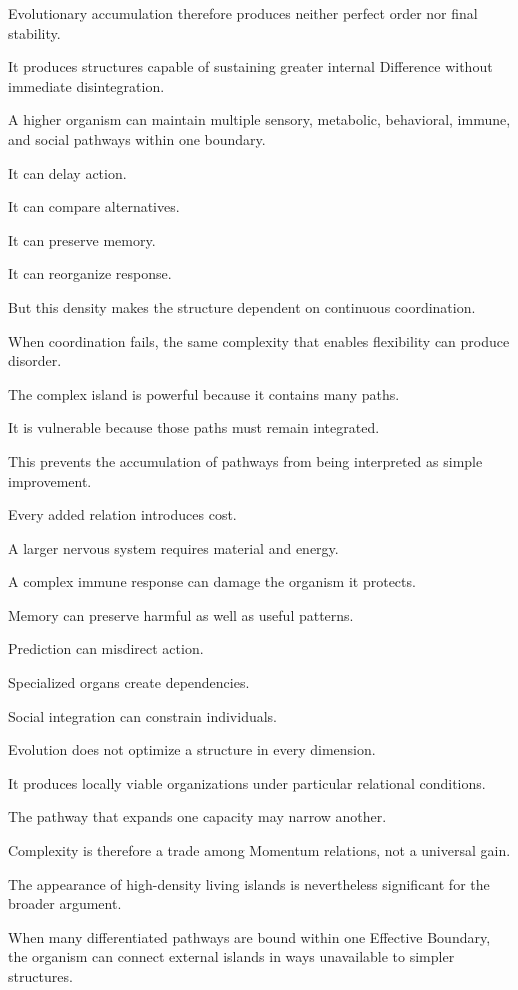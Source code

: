 Evolutionary accumulation therefore produces neither perfect order nor final stability.

It produces structures capable of sustaining greater internal Difference without immediate disintegration.

A higher organism can maintain multiple sensory, metabolic, behavioral, immune, and social pathways within one boundary.

It can delay action.

It can compare alternatives.

It can preserve memory.

It can reorganize response.

But this density makes the structure dependent on continuous coordination.

When coordination fails, the same complexity that enables flexibility can produce disorder.

The complex island is powerful because it contains many paths.

It is vulnerable because those paths must remain integrated.

This prevents the accumulation of pathways from being interpreted as simple improvement.

Every added relation introduces cost.

A larger nervous system requires material and energy.

A complex immune response can damage the organism it protects.

Memory can preserve harmful as well as useful patterns.

Prediction can misdirect action.

Specialized organs create dependencies.

Social integration can constrain individuals.

Evolution does not optimize a structure in every dimension.

It produces locally viable organizations under particular relational conditions.

The pathway that expands one capacity may narrow another.

Complexity is therefore a trade among Momentum relations, not a universal gain.

The appearance of high-density living islands is nevertheless significant for the broader argument.

When many differentiated pathways are bound within one Effective Boundary, the organism can connect external islands in ways unavailable to simpler structures.

